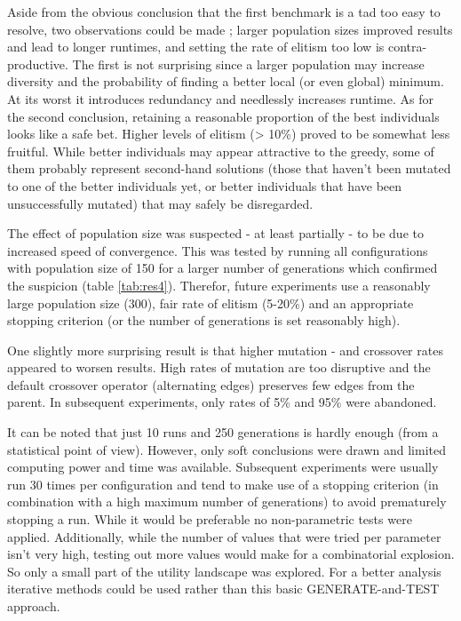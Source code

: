 \par\noindent Aside from the obvious conclusion that the first benchmark is a tad too easy to resolve, two observations could be made ; larger population sizes improved results and lead to longer runtimes, and setting the rate of elitism too low is contra-productive. The first is not surprising since a larger population may increase diversity and the probability of finding a better local (or even global) minimum. At its worst it introduces redundancy and needlessly increases runtime. As for the second conclusion, retaining a reasonable proportion of the best individuals looks like a safe bet. Higher levels of elitism (> 10\%) proved to be somewhat less fruitful. While better individuals may appear attractive to the greedy, some of them probably represent second-hand solutions (those that haven't been mutated to one of the better individuals yet, or better individuals that have been unsuccessfully mutated) that may safely be disregarded.\\

\par\noindent The effect of population size was suspected - at least partially - to be due to increased speed of convergence. This was tested by running all configurations with population size of 150 for a larger number of generations which confirmed the suspicion (table \ref{tab:res4}). Therefor, future experiments use a reasonably large population size (300), fair rate of elitism (5-20\%) and an appropriate stopping criterion (or the number of generations is set reasonably high).\\

\par\noindent One slightly more surprising result is that higher mutation - and crossover rates appeared to worsen results. High rates of mutation are too disruptive and the default crossover operator (alternating edges) preserves few edges from the parent. In subsequent experiments, only rates of 5\% and 95\% were abandoned.\\

\par\noindent It can be noted that just 10 runs and 250 generations is hardly enough (from a statistical point of view). However, only soft conclusions were drawn and limited computing power and time was available. Subsequent experiments were usually run 30 times per configuration and tend to make use of a stopping criterion (in combination with a high maximum number of generations) to avoid prematurely stopping a run. While it would be preferable no non-parametric tests were applied. Additionally, while the number of values that were tried per parameter isn't very high, testing out more values would make for a combinatorial explosion. So only a small part of the utility landscape was explored. For a better analysis iterative methods could be used rather than this basic GENERATE-and-TEST approach.

